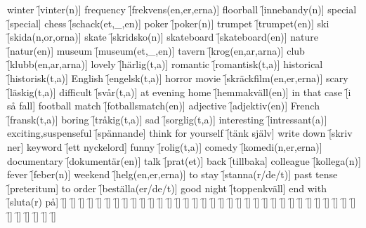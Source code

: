 \begin{questions}
\begin{multicols}{2}
        \question winter \f[vinter(n)]
        \question frequency \f[frekvens(en,er,erna)]
        \question floorball \f[innebandy(n)]
        \question special \f[special]
        \question chess \f[schack(et,\_,en)]
        \question poker \f[poker(n)]
        \question trumpet \f[trumpet(en)]
        \question ski \f[skida(n,or,orna)]
        \question skate \f[skridsko(n)]
        \question skateboard \f[skateboard(en)]
        \question nature \f[natur(en)]
        \question museum \f[museum(et,\_,en)]
        \question tavern \f[krog(en,ar,arna)]
        \question club \f[klubb(en,ar,arna)]
        \question lovely \f[härlig(t,a)]
        \question romantic \f[romantisk(t,a)]
        \question historical \f[historisk(t,a)]
        \question English \f[engelsk(t,a)]
        \question horror movie \f[skräckfilm(en,er,erna)]
        \question scary \f[läskig(t,a)]
        \question difficult \f[svår(t,a)]
        \question at evening home \f[hemmakväll(en)]
        \question in that case \f[i så fall]
        \question football match \f[fotballsmatch(en)]
        \question adjective \f[adjektiv(en)]
        \question French \f[fransk(t,a)]
        \question boring \f[tråkig(t,a)]
        \question sad \f[sorglig(t,a)]
        \question interesting \f[intressant(a)]
        \question exciting,suspenseful \f[spännande]
        \question think for yourself \f[tänk själv]
        \question write down \f[skriv ner]
        \question keyword \f[ett nyckelord]
        \question funny \f[rolig(t,a)]
        \question comedy \f[komedi(n,er,erna)]
        \question documentary \f[dokumentär(en)]
        \question talk \f[prat(et)]
        \question back \f[tillbaka]
        \question colleague \f[kollega(n)]
        \question fever \f[feber(n)]
        \question weekend \f[helg(en,er,erna)]
        \question to stay \f[stanna(r/de/t)]
        \question past tense \f[preteritum]
        \question to order \f[beställa(er/de/t)]
        \question good night \f[toppenkväll]
        \question end with \f[sluta(r) på]
        \question  \f[]
        \question  \f[]
        \question  \f[]
        \question  \f[]
        \question  \f[]
        \question  \f[]
        \question  \f[]
        \question  \f[]
        \question  \f[]
        \question  \f[]
        \question  \f[]
        \question  \f[]
        \question  \f[]
        \question  \f[]
        \question  \f[]
        \question  \f[]
        \question  \f[]
        \question  \f[]
        \question  \f[]
        \question  \f[]
        \question  \f[]
        \question  \f[]
        \question  \f[]
        \question  \f[]
        \question  \f[]
        \question  \f[]
        \question  \f[]
        \question  \f[]
        \question  \f[]
        \question  \f[]
        \question  \f[]
        \question  \f[]
        \question  \f[]
        \question  \f[]
        \question  \f[]
        \question  \f[]
        \question  \f[]
        \question  \f[]
        \question  \f[]
        \question  \f[]
    \end{multicols}
\end{questions}
